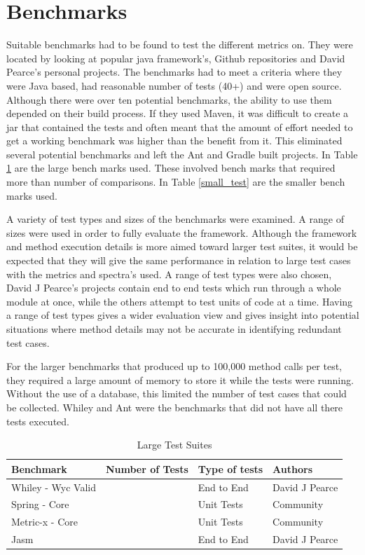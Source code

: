 \section{Benchmarks}
\label{S:bench}
Suitable benchmarks had to be found to test the different metrics on. They were located by looking at popular java framework's, Github repositories and David Pearce's personal projects. The benchmarks had to meet a criteria where they were Java based, had reasonable number of tests (40+) and were open source. Although there were over ten potential benchmarks, the ability to use them depended on their build process. If they used Maven, it was difficult to create a jar that contained the tests and often meant that the amount of effort needed to get a working benchmark was higher than the benefit from it. This eliminated several potential benchmarks and left the Ant and Gradle built projects. In Table \ref{large_test} are the large bench marks used. These involved bench marks that required more than  number of comparisons. In Table \ref{small_test} are the smaller bench marks used. 

A variety of test types and sizes of the benchmarks were examined. A range of sizes were used in order to fully evaluate the framework. Although the framework and method execution details is more aimed toward larger test suites, it would be expected that they will give the same performance in relation to large test cases with the metrics and spectra's used. A range of test types were also chosen, David J Pearce's projects contain end to end tests which run through a whole module at once, while the others attempt to test units of code at a time. Having a range of test types gives a wider evaluation view and gives insight into potential situations where method details may not be accurate in identifying redundant test cases.

For the larger benchmarks that produced up to 100,000 method calls per test, they required a large amount of memory to store it while the tests were running. Without the use of a database, this limited the number of test cases that could be collected. Whiley and Ant were the benchmarks that did not have all there tests executed.  

\begin{table}[]
\centering
\caption{Large Test Suites}
\label{large_test}
\begin{tabular}{|l|l|l|l|}
\hline
{\bf Benchmark}       &  {\bf Number of Tests} & {\bf Type of tests} & {\bf Authors}   \\ \hline
Whiley - Wyc Valid         &       &    End to End      & David J Pearce          \\ \hline
Spring - Core   &       &    Unit Tests      & Community \\ \hline
Metric-x - Core &       &    Unit Tests      & Community \\ \hline
Jasm              &             &    End to End      & David J Pearce \\ \hline

\end{tabular}
\end{table}

